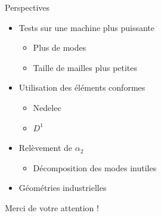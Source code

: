 \documentclass{beamer}
\begin{document}
\begin{frame}{Perspectives}
\begin{itemize}
\item Tests sur une machine plus puissante
\begin{itemize}
\item Plus de modes
\item Taille de mailles plus petites
\end{itemize}
\item Utilisation des éléments conformes
\begin{itemize}
\item Nedelec
\item $D^1$
\end{itemize}
\item Relèvement de $\alpha_2$
\begin{itemize}
\item Décomposition des modes inutiles
\end{itemize}
\item Géométries industrielles
\end{itemize}
\end{frame}

\begin{frame}
\begin{center}
Merci de votre attention !
\end{center}
\end{frame}
\end{document}
